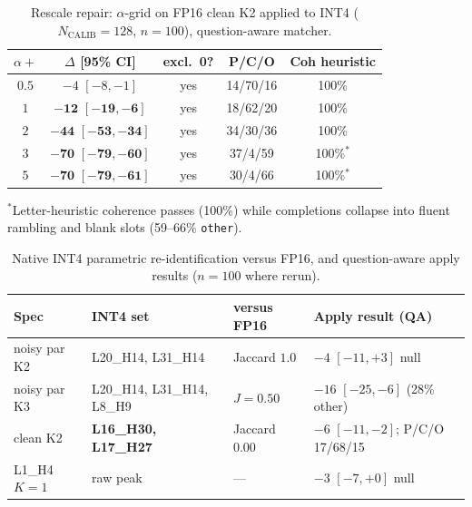 \documentclass{article} %
\begin{document}
\begin{table}[h]
\caption{Rescale repair: $\alpha$-grid on FP16 clean K2 applied to INT4 ($N_{\mathrm{CALIB}}{=}128$, $n{=}100$), question-aware matcher.}
\label{tab:alpha-grid}
\centering\small
\begin{tabular}{ccccc}
\toprule
$\alpha{+}$ & $\Delta$ [95\% CI] & excl.\ 0? & P/C/O & Coh heuristic \\
\midrule
$0.5$ & $-4$ $[-8,-1]$ & yes & 14/70/16 & 100\% \\
$1$ & $\mathbf{-12}$ $\mathbf{[-19,-6]}$ & yes & 18/62/20 & 100\% \\
$2$ & $\mathbf{-44}$ $\mathbf{[-53,-34]}$ & yes & 34/30/36 & 100\% \\
$3$ & $\mathbf{-70}$ $\mathbf{[-79,-60]}$ & yes & 37/4/59 & 100\%$^*$ \\
$5$ & $\mathbf{-70}$ $\mathbf{[-79,-61]}$ & yes & 30/4/66 & 100\%$^*$ \\
\bottomrule
\end{tabular}
\par\vspace{1pt}\raggedright\tiny $^*$Letter-heuristic coherence passes (100\%) while completions collapse into fluent rambling and blank slots (59--66\% \texttt{other}).
\end{table}

\begin{table}[h]
\caption{Native INT4 parametric re-identification versus FP16, and question-aware apply results ($n{=}100$ where rerun).}
\label{tab:native-id}
\centering\footnotesize
\begin{tabular}{p{1.35in}p{1.15in}p{0.9in}p{1.4in}}
\toprule
Spec & INT4 set & versus FP16 & Apply result (QA) \\
\midrule
noisy par K2 & L20\_H14, L31\_H14 & Jaccard $\mathbf{1.0}$ & $-4$ $[-11,+3]$ null \\
noisy par K3 & L20\_H14, L31\_H14, L8\_H9 & $J{=}0.50$ & $-16$ $[-25,-6]$ (28\% other) \\
clean K2 & \textbf{L16\_H30, L17\_H27} & Jaccard $\mathbf{0.00}$ & $-6$ $[-11,-2]$; P/C/O 17/68/15 \\
L1\_H4 $K{=}1$ & raw peak & --- & $-3$ $[-7,+0]$ null \\
\bottomrule
\end{tabular}
\end{table}
\end{document}
